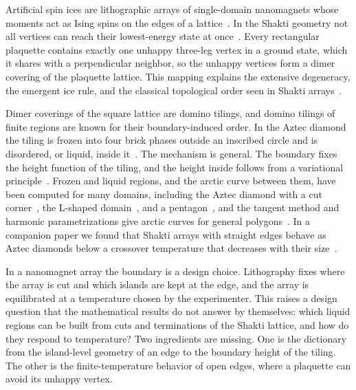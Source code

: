 \documentclass[reprint,aps,prb,floatfix,longbibliography,amsmath,amssymb]{revtex4-2}
\begin{document}
Artificial spin ices are lithographic arrays of single-domain nanomagnets whose moments act as Ising spins on the edges of a lattice~\cite{Wang2006,Nisoli2013RMP,Skjaervo2020}. In the Shakti geometry not all vertices can reach their lowest-energy state at once~\cite{Morrison2013,Chern2013}. Every rectangular plaquette contains exactly one unhappy three-leg vertex in a ground state, which it shares with a perpendicular neighbor, so the unhappy vertices form a dimer covering of the plaquette lattice. This mapping explains the extensive degeneracy, the emergent ice rule, and the classical topological order seen in Shakti arrays~\cite{Chern2013,Gilbert2014,Lao2018}.

Dimer coverings of the square lattice are domino tilings, and domino tilings of finite regions are known for their boundary-induced order. In the Aztec diamond the tiling is frozen into four brick phases outside an inscribed circle and is disordered, or liquid, inside it~\cite{EKLP1992,Jockusch1998,Cohn1996}. The mechanism is general. The boundary fixes the height function of the tiling, and the height inside follows from a variational principle~\cite{Cohn2001,KOS2006,Kenyon2007}. Frozen and liquid regions, and the arctic curve between them, have been computed for many domains, including the Aztec diamond with a cut corner~\cite{ColomoPronko2013,FerrariVeto2021}, the L-shaped domain~\cite{CPS2019,CharlierClaeys2025}, and a pentagon~\cite{ColomoPronko2024}, and the tangent method and harmonic parametrizations give arctic curves for general polygons~\cite{ColomoSportiello2016,Astala2020,KenyonPrause2020,Kuchumov2026}. In a companion paper we found that Shakti arrays with straight edges behave as Aztec diamonds below a crossover temperature that decreases with their size~\cite{KimVorticity}.

In a nanomagnet array the boundary is a design choice. Lithography fixes where the array is cut and which islands are kept at the edge, and the array is equilibrated at a temperature chosen by the experimenter. This raises a design question that the mathematical results do not answer by themselves: which liquid regions can be built from cuts and terminations of the Shakti lattice, and how do they respond to temperature? Two ingredients are missing. One is the dictionary from the island-level geometry of an edge to the boundary height of the tiling. The other is the finite-temperature behavior of open edges, where a plaquette can avoid its unhappy vertex.
\end{document}
